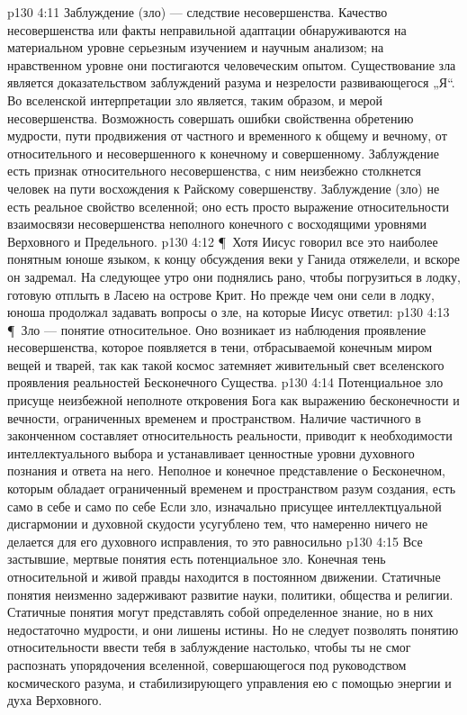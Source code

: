 \vs p130 4:11 Заблуждение (зло) --- следствие несовершенства. Качество несовершенства или факты неправильной адаптации обнаруживаются на материальном уровне серьезным изучением и научным анализом; на нравственном уровне они постигаются человеческим опытом. Существование зла является доказательством заблуждений разума и незрелости развивающегося „Я“. Во вселенской интерпретации зло является, таким образом, и мерой несовершенства. Возможность совершать ошибки свойственна обретению мудрости, пути продвижения от частного и временного к общему и вечному, от относительного и несовершенного к конечному и совершенному. Заблуждение есть признак относительного несовершенства, с ним неизбежно столкнется человек на пути восхождения к Райскому совершенству. Заблуждение (зло) не есть реальное свойство вселенной; оно есть просто выражение относительности взаимосвязи несовершенства неполного конечного с восходящими уровнями Верховного и Предельного.
\vs p130 4:12 \P\ Хотя Иисус говорил все это наиболее понятным юноше языком, к концу обсуждения веки у Ганида отяжелели, и вскоре он задремал. На следующее утро они поднялись рано, чтобы погрузиться в лодку, готовую отплыть в Ласею на острове Крит. Но прежде чем они сели в лодку, юноша продолжал задавать вопросы о зле, на которые Иисус ответил:
\vs p130 4:13 \P\ Зло --- понятие относительное. Оно возникает из наблюдения проявление несовершенства, которое появляется в тени, отбрасываемой конечным миром вещей и тварей, так как такой космос затемняет живительный свет вселенского проявления реальностей Бесконечного Существа.
\vs p130 4:14 Потенциальное зло присуще неизбежной неполноте откровения Бога как выражению бесконечности и вечности, ограниченных временем и пространством. Наличие частичного в законченном составляет относительность реальности, приводит к необходимости интеллектуального выбора и устанавливает ценностные уровни духовного познания и ответа на него. Неполное и конечное представление о Бесконечном, которым обладает ограниченный временем и пространством разум создания, есть само в себе и само по себе  Если зло, изначально присущее интеллектцуальной дисгармонии и духовной скудости усугублено тем, что намеренно ничего не делается для его духовного исправления, то это равносильно 
\vs p130 4:15 Все застывшие, мертвые понятия есть потенциальное зло. Конечная тень относительной и живой правды находится в постоянном движении. Статичные понятия неизменно задерживают развитие науки, политики, общества и религии. Статичные понятия могут представлять собой определенное знание, но в них недостаточно мудрости, и они лишены истины. Но не следует позволять понятию относительности ввести тебя в заблуждение настолько, чтобы ты не смог распознать упорядочения вселенной, совершающегося под руководством космического разума, и стабилизирующего управления ею с помощью энергии и духа Верховного.
